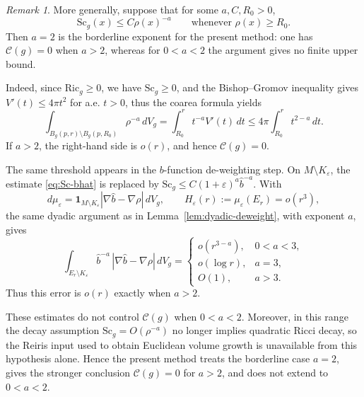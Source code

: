 \documentclass[12pt,oneside,a4paper]{article}
\theoremstyle{mytheorem}
\theoremstyle{remark}
\newtheorem{remark}[definition]{Remark}
\begin{document}
\begin{remark}
More generally, suppose that for some $a,C,R_0>0$,
\[
\mathrm{Sc}_g(x)\le C\rho(x)^{-a}
\qquad\text{whenever }\rho(x)\ge R_0 .
\]
Then $a=2$ is the borderline exponent for the present method: one has
$\mathcal C(g)=0$ when $a>2$, whereas for $0<a<2$ the argument gives no finite
upper bound.

Indeed, since $\mathrm{Ric}_g\ge0$, we have $\mathrm{Sc}_g\ge0$, and the
Bishop--Gromov inequality  gives $V'(t)\le4\pi t^2$ for a.e. $t>0$,
thus the coarea formula yields
\begin{equation*}
\int_{B_g(p,r)\setminus B_g(p,R_0)}\rho^{-a}\,dV_g
=
\int_{R_0}^{r}t^{-a}V'(t)\,dt
\le
4\pi\int_{R_0}^{r}t^{2-a}\,dt .
\end{equation*}
If $a>2$, the right-hand side is $o(r)$, and hence $\mathcal C(g)=0$.

The same threshold appears in the $b$-function de-weighting step. On
$M\setminus K_\varepsilon$, the estimate \eqref{eq:Sc-bhat} is replaced by
$\mathrm{Sc}_g\le C(1+\varepsilon)^a\widehat b^{-a}.$
With
\[
d\mu_\varepsilon
=
\mathbf 1_{M\setminus K_\varepsilon}
|\nabla\widehat b-\nabla\rho|\,dV_g,
\qquad
H_\varepsilon(r):=\mu_\varepsilon(E_r)=o(r^3),
\]
the same dyadic argument as in Lemma~\ref{lem:dyadic-deweight}, with exponent
$a$, gives
\begin{equation*}
\int_{E_r\setminus K_\varepsilon}
\widehat b^{-a}\,|\nabla\widehat b-\nabla\rho|\,dV_g
=
\begin{cases}
o(r^{3-a}), & 0<a<3,\\[0.3ex]
o(\log r), & a=3,\\[0.3ex]
O(1), & a>3.
\end{cases}
\end{equation*}
Thus this error is $o(r)$ exactly when $a>2$.

 These estimates do not control
$\mathcal C(g)$ when $0<a<2$. Moreover, in this range the decay assumption
$\mathrm{Sc}_g=O(\rho^{-a})$ no longer implies quadratic Ricci decay, so the
Reiris input used to obtain Euclidean volume growth is unavailable from this
hypothesis alone. Hence the present method treats the borderline case $a=2$,
gives the stronger conclusion $\mathcal C(g)=0$ for $a>2$, and does not extend
to $0<a<2$.
\end{remark}
\end{document}
